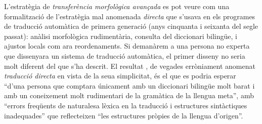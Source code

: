 L'estratègia de \emph{transferència morfològica avançada} es pot veure
com una formalització de l'estratègia mal anomenada \emph{directa} que
s'usava en els programes de traducció automàtica de primera generació
(anys cinquanta i seixanta del segle passat): anàlisi morfològica
rudimentària, consulta del diccionari bilingüe, i ajustos locals com
ara reordenaments. Si demanàrem a una persona no experta que
dissenyara un sistema de traducció automàtica, el primer disseny no
seria molt diferent del que s'ha descrit.  El resultat
\citep[secció~4.2]{hutchins92b}, de vegades erròniament anomenat
\emph{traducció directa} en vista de la seua simplicitat, és el que es
podria esperar ``d'una persona que comptara únicament amb un
diccionari bilingüe molt barat i amb un coneixement molt rudimentari
de la gramàtica de la llengua meta'', amb ``errors freqüents de
naturalesa lèxica en la traducció i estructures sintàctiques
inadequades'' que reflecteixen ``les estructures pròpies de la llengua
d'origen''.








